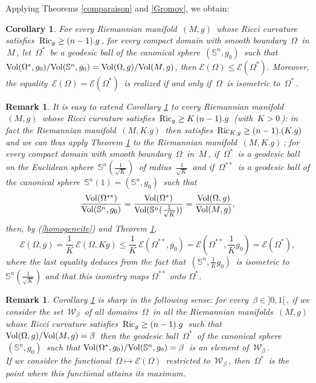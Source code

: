 \documentclass[11pt, reqno]{amsart}
\newtheorem{remarque}[theoreme]{Remark}
\newtheorem{corollaire}[theoreme]{Corollary}
\theoremstyle{plain}
\begin{document}
Applying Theorems \ref{comparaison} and \ref{Gromov}, we obtain:

\begin{corollaire}\label{compsphere1}
For every Riemannian manifold $\,(M,g)\,$ whose Ricci
curvature satisfies $\,{\rm Ric}_g \ge (n-1).g\,$, for every compact domain with smooth boundary 
$\,\Omega \,$ in $\, M \,$, let $\,\Omega^*\,$ be a geodesic ball of the canonical sphere 
$\, (\mathbb S^n , g_0 )\,$ such that 
${{\rm Vol} (\Omega^*, g_0)}/{{\rm Vol} (\mathbb S^n , g_0 )} 
= {{\rm Vol}  (\Omega , g )}/{{\rm Vol} (M , g )}$, then
${\mathcal E} (\Omega) \leq {\mathcal E} (\Omega^*).$
Moreover, the equality $\,{\mathcal E} (\Omega) = {\mathcal E} (\Omega^*)\,$ is realized 
if and only if $\,\Omega\,$ is isometric to $\,\Omega^*\,$.
\end{corollaire}

\begin{remarque}\rm
It is easy to extend 
Corollary \ref{compsphere1} 
to every Riemannian manifold $\,(M,g)\,$ whose Ricci curvature satisfies $\,{\rm Ric}_g \ge 
K\,(n-1).g\,$ (with $\,K > 0\,$): in fact the Riemannian manifold $\,(M, K.g)\,$ then satisfies
$\,{\rm Ric}_{K.g} \ge (n-1). (K.g)\,$ and we can thus apply Theorem \ref{compsphere1} to the 
Riemannian manifold $\,(M, K.g)\,$; for every compact domain with smooth boundary 
$\,\Omega \,$ in $\, M \,$, if $\,\Omega^*\,$ is a geodesic ball on the Euclidean sphere 
$\, \mathbb S^n (\frac{1}{\sqrt{K}})\,$ of radius 
$\,\frac{1}{\sqrt{K}}\,$ and if $\,\Omega^{**}\,$ is a geodesic ball of  the canonical sphere 
$\, \mathbb S^n (1) = (\mathbb S^n , g_0 )\,$ such that 
$$\dfrac{{\rm Vol} (\Omega^{**})}{{\rm Vol} (\mathbb S^n , g_0 )} =
\dfrac{{\rm Vol} (\Omega^* )}{{\rm Vol} (\mathbb S^n (\frac{1}{\sqrt{K}}))} 
= \dfrac{{\rm Vol} (\Omega , g )}{{\rm Vol} (M , g )},$$ 
then, by (\ref{homogeneite}) and Theorem \ref{compsphere1},
$${\mathcal E} (\Omega , g) = \frac{1}{K}\  {\mathcal E} (\Omega , Kg) \le  \frac{1}{K}\  
{\mathcal E} (\Omega^{**} , g_0) = {\mathcal E} (\Omega^{**} , \frac{1}{K} g_0) = {\mathcal E} (\Omega^*),$$
where the last equality deduces from the fact that $\, (\mathbb S^n , \frac{1}{K} g_0 )\,$ is isometric to
$\mathbb S^n (\frac{1}{\sqrt{K}})$ and that this isometry maps $\Omega^{**}$ onto
$\Omega^{*}$. 
\end{remarque}

\begin{remarque}\rm
Corollary \ref{compsphere1}  is sharp
in the following sense:
for every $\,\beta \in ]0 , 1 [\,$, if we consider the set 
$\,{\mathcal W}_\beta\,$ of all domains $\,\Omega \,$ in all
the Riemannian manifolds $\,(M,g)\,$ whose Ricci curvature satisfies $\,{\rm Ric}_g \ge (n-1).g\,$
such that ${\rm Vol} (\Omega , g ) / {\rm Vol} (M , g ) = \beta\,$ then the geodesic 
ball $\,\Omega^*\,$ of the canonical sphere $\, (\mathbb S^n , g_0 )\,$ such that 
${\rm Vol} (\Omega^*, g_0)/ {\rm Vol} (\mathbb S^n , g_0 ) = \beta\,$ is an element
of $\,{\mathcal W}_\beta\,$.\\ 
If we consider the functional $\, \Omega \mapsto {\mathcal E} (\Omega) \,$
restricted to $\,{\mathcal W}_\beta\,$, then $\,\Omega^*\,$ is the point where this functional
attains its maximum.
\end{remarque}
\end{document}
